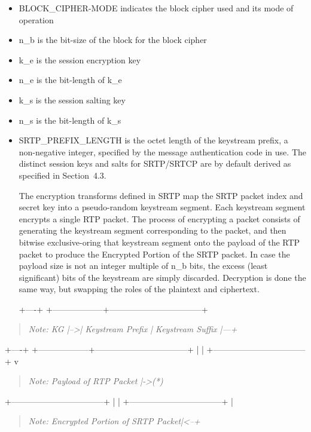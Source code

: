 \documentclass{article}
\begin{document}
\begin{itemize}
\item BLOCK\_CIPHER-MODE indicates the block cipher used and its mode of operation
\item n\_b is the bit-size of the block for the block cipher
\item k\_e is the session encryption key
\item n\_e is the bit-length of k\_e
\item k\_s is the session salting key
\item n\_s is the bit-length of k\_s
\item SRTP\_PREFIX\_LENGTH is the octet length of the keystream prefix, a non-negative integer, specified by the message authentication code in use.
The distinct session keys and salts for SRTP/SRTCP are by default derived as specified in Section~4.3.

The encryption transforms defined in SRTP map the SRTP packet index and secret key into a pseudo-random keystream segment.  Each keystream segment encrypts a single RTP packet.  The process of encrypting a packet consists of generating the keystream segment corresponding to the packet, and then bitwise exclusive-oring that keystream segment onto the payload of the RTP packet to produce the Encrypted Portion of the SRTP packet.  In case the payload size is not an integer multiple of n\_b bits, the excess (least significant) bits of the keystream are simply discarded.  Decryption is done the same way, but swapping the roles of the plaintext and ciphertext.

+----+   +------------------+---------------------------------+

\end{itemize}
\begin{quote}
\textit{Note: KG |-->| Keystream Prefix |          Keystream Suffix       |---+}
\end{quote}

+----+   +------------------+---------------------------------+   | | +---------------------------------+   v

\begin{quote}
\textit{Note: Payload of RTP Packet       |->(*)}
\end{quote}

+---------------------------------+   | | +---------------------------------+   |

\begin{quote}
\textit{Note: Encrypted Portion of SRTP Packet|<--+}
\end{quote}
\end{document}
